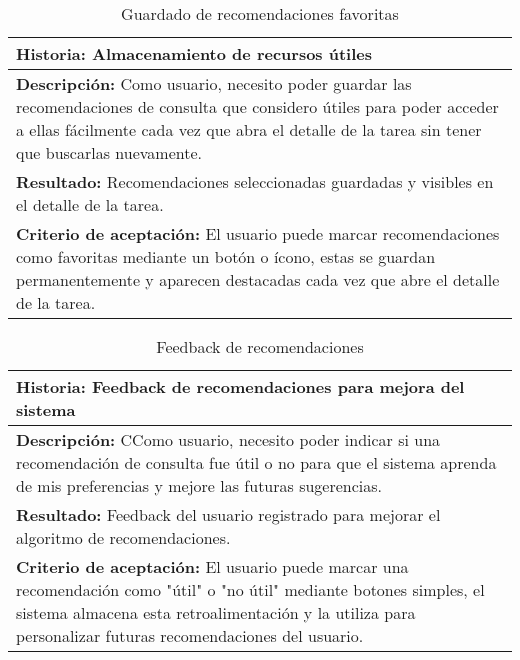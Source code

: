\documentclass[11pt]{article}
\begin{document}
\begin{table}[H]
    \centering
    \begin{tabular}{|p{15cm}|}
    \hline
    \textbf{Historia: } Almacenamiento de recursos útiles\\
    \hline
    \textbf{Descripción: }Como usuario, necesito poder guardar las recomendaciones de consulta que considero útiles para poder 
    acceder a ellas fácilmente cada vez que abra el detalle de la tarea sin tener que buscarlas nuevamente.\\
    \hline
    \textbf{Resultado: } Recomendaciones seleccionadas guardadas y visibles en el detalle de la tarea.\\
    \hline
    \textbf{Criterio de aceptación: }El usuario puede marcar recomendaciones como favoritas mediante un botón o ícono, estas se guardan 
    permanentemente y aparecen destacadas cada vez que abre el detalle de la tarea.\\
    \hline
    \end{tabular}
    \caption{Guardado de recomendaciones favoritas}
    \label{user-story9}
\end{table}

\begin{table}[H]
    \centering
    \begin{tabular}{|p{15cm}|}
    \hline
    \textbf{Historia: } Feedback de recomendaciones para mejora del sistema\\
    \hline
    \textbf{Descripción: }CComo usuario, necesito poder indicar si una recomendación de consulta fue útil o
     no para que el sistema aprenda de mis preferencias y mejore las futuras sugerencias.\\
    \hline
    \textbf{Resultado: } Feedback del usuario registrado para mejorar el algoritmo de recomendaciones.\\
    \hline
    \textbf{Criterio de aceptación: } El usuario puede marcar una recomendación como "útil" o "no útil" mediante botones simples, 
    el sistema almacena esta retroalimentación y la utiliza para personalizar futuras recomendaciones del usuario.\\
    \hline
    \end{tabular}
    \caption{Feedback de recomendaciones}
    \label{user-story10}
\end{table}
\pagebreak
\printbibliography[heading=bibintoc]
\end{document}
